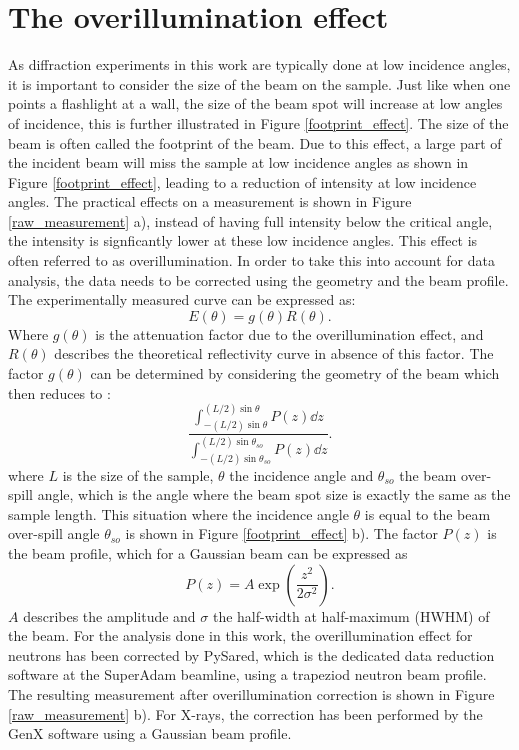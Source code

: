 \section{The overillumination effect}
As diffraction experiments in this work are typically done at low incidence angles, it is important to consider the size of the beam on the sample. Just like when one points a flashlight at a wall, the size of the beam spot will increase at low angles of incidence, this is further illustrated in Figure \ref{footprint_effect}. The size of the beam is often called the footprint of the beam. Due to this effect, a large part of the incident beam will miss the sample at low incidence angles as shown in Figure \ref{footprint_effect}, leading to a reduction of intensity at low incidence angles. The practical effects on a measurement is shown in Figure \ref{raw_measurement} a), instead of having full intensity below the critical angle, the intensity is signficantly lower at these low incidence angles. This effect is often referred to as overillumination. In order to take this into account for data analysis, the data needs to be corrected using the geometry and the beam profile. The experimentally measured curve can be expressed as:
\begin{equation}
	E(\theta) = g(\theta)R(\theta).
\end{equation}
Where $g(\theta)$ is the attenuation factor due to the overillumination effect, and $R(\theta)$ describes the theoretical reflectivity curve in absence of this factor. The factor $g(\theta)$ can be determined by considering the geometry of the beam which then reduces to \cite{footprintnew} \cite{footprintold}:
\begin{equation}
	\frac{\int^{(L/2)\sin \theta}_{-(L/2)\sin \theta} P(z) \dd z}{\int^{(L/2)\sin \theta_{so}}_{-(L/2)\sin \theta_{so}} P(z) \dd z}.
\end{equation}
where $L$ is the size of the sample, $\theta$ the incidence angle and $\theta_{so}$ the beam over-spill angle, which is the angle where the beam spot size is exactly the same as the sample length. This situation where the incidence angle $\theta$ is equal to the beam over-spill angle $\theta_{so}$ is shown in Figure \ref{footprint_effect} b). The factor $P(z)$ is the beam profile, which for a Gaussian beam can be expressed as 
\begin{equation}
	P(z) = A \exp(\frac{z^2}{2\sigma^2}).
\end{equation}
$A$ describes the amplitude and $\sigma$ the half-width at half-maximum (HWHM) of the beam. For the analysis done in this work, the overillumination effect for neutrons has been corrected by PySared, which is the dedicated data reduction software at the SuperAdam beamline, using a trapeziod neutron beam profile. The resulting measurement after overillumination correction is shown in Figure \ref{raw_measurement} b). For X-rays, the correction has been performed by the GenX software \cite{genx} \cite{genx_new} using a Gaussian beam profile.
